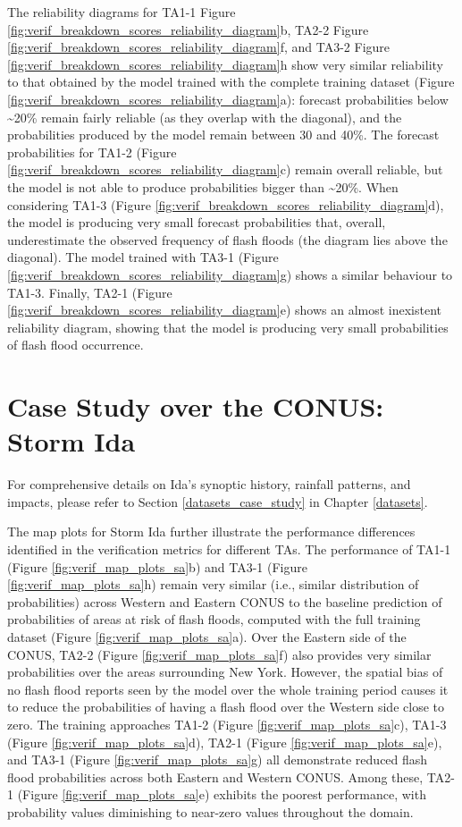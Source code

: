 The  reliability diagrams for TA1-1 Figure \ref{fig:verif_breakdown_scores_reliability_diagram}b, TA2-2 Figure \ref{fig:verif_breakdown_scores_reliability_diagram}f, and TA3-2 Figure \ref{fig:verif_breakdown_scores_reliability_diagram}h show very similar reliability to that obtained by the model trained with the complete training dataset (Figure \ref{fig:verif_breakdown_scores_reliability_diagram}a): forecast probabilities below \sim20\% remain fairly reliable (as they overlap with the diagonal), and the probabilities produced by the model remain between 30 and 40\%. The forecast probabilities for TA1-2 (Figure \ref{fig:verif_breakdown_scores_reliability_diagram}c) remain overall reliable, but the model is not able to produce probabilities bigger than \sim20\%. When considering TA1-3 (Figure \ref{fig:verif_breakdown_scores_reliability_diagram}d), the model is producing very small forecast probabilities that, overall, underestimate the observed frequency of flash floods (the diagram lies above the diagonal). The model trained with TA3-1 (Figure \ref{fig:verif_breakdown_scores_reliability_diagram}g) shows a similar behaviour to TA1-3. Finally, TA2-1 (Figure \ref{fig:verif_breakdown_scores_reliability_diagram}e) shows an almost inexistent reliability diagram, showing that the model is producing very small probabilities of flash flood occurrence.   


\section{Case Study over the CONUS: Storm Ida}

For comprehensive details on Ida's synoptic history, rainfall patterns, and impacts, please refer to Section \ref{datasets_case_study} in Chapter \ref{datasets}.

The map plots for Storm Ida further illustrate the performance differences identified in the verification metrics for different TAs. The performance of TA1-1 (Figure \ref{fig:verif_map_plots_sa}b) and TA3-1 (Figure \ref{fig:verif_map_plots_sa}h) remain very similar (i.e., similar distribution of probabilities) across Western and Eastern CONUS to the baseline prediction of probabilities of areas at risk of flash floods, computed with the full training dataset (Figure \ref{fig:verif_map_plots_sa}a). Over the Eastern side of the CONUS, TA2-2 (Figure \ref{fig:verif_map_plots_sa}f) also provides very similar probabilities over the areas surrounding New York. However, the spatial bias of no flash flood reports seen by the model over the whole training period causes it to reduce the probabilities of having a flash flood over the Western side close to zero. The training approaches TA1-2 (Figure \ref{fig:verif_map_plots_sa}c), TA1-3 (Figure \ref{fig:verif_map_plots_sa}d), TA2-1 (Figure \ref{fig:verif_map_plots_sa}e), and TA3-1 (Figure \ref{fig:verif_map_plots_sa}g) all demonstrate reduced flash flood probabilities across both Eastern and Western CONUS. Among these, TA2-1 (Figure \ref{fig:verif_map_plots_sa}e) exhibits the poorest performance, with probability values diminishing to near-zero values throughout the domain.

